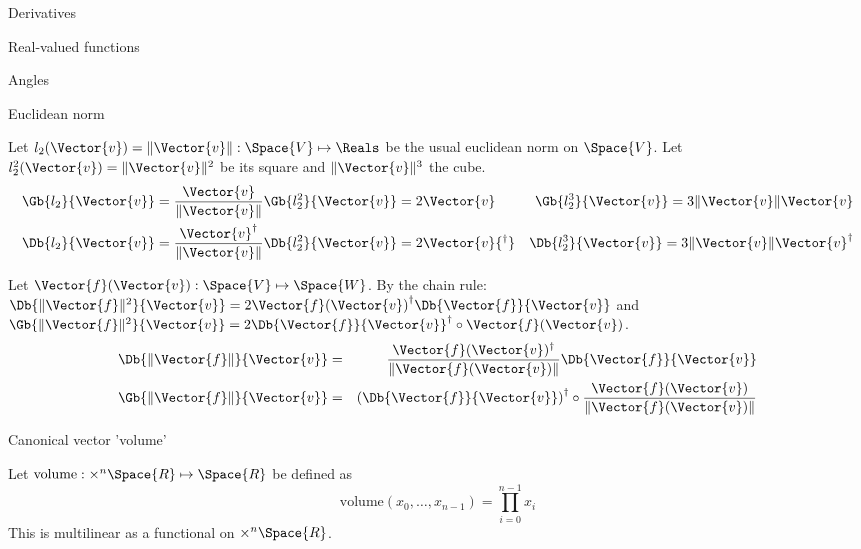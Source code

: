 \begin{plSection}{Derivatives}
\begin{plSection}{Real-valued functions}
\begin{plSection}{Angles}
\end{plSection}%
\begin{plSection}{Euclidean norm}
\label{sec:derivatives-of-euclidean-norm}

Let $l_2(\Vector{v}) = \| \Vector{v}  \|: \Space{V} \mapsto \Reals$
be the usual euclidean norm on $\Space{V}$.
Let $l_2^2(\Vector{v}) = \| \Vector{v}  \|^2 $
be its square and $ \| \Vector{v}  \|^3$ the cube.
\begin{eqnarray}
\label{eq:l2-gradient}
\Gb{l_2}{\Vector{v}} = \frac{ \Vector{v} }{ \| \Vector{v}  \|} &
\Gb{l_2^2}{\Vector{v}} =  2\Vector{v} &
\Gb{l_2^3}{\Vector{v}} = 3 \| \Vector{v}  \| \Vector{v} \\
\Db{l_2}{\Vector{v}} = \frac{ \Vector{v}^\dagger }{ \| \Vector{v}  \|} &
\Db{l_2^2}{\Vector{v}} = 2\Vector{v}{^\dagger} &
\Db{l_2^3}{\Vector{v}} = 3 \| \Vector{v}  \| \Vector{v}^\dagger \nonumber
\end{eqnarray}

Let $\Vector{f}(\Vector{v}) : \Space{V} \mapsto \Space{W}$.
By the chain rule:
$\Db{\| \Vector{f} \|^2}{\Vector{v}}  =  2 {\Vector{f}(\Vector{v})}^{\dagger} \Db{\Vector{f}}{\Vector{v}} $
and
$\Gb{\| \Vector{f} \|^2}{\Vector{v}}  =  2 \Db{\Vector{f}}{\Vector{v}}^\dagger \circ \Vector{f}(\Vector{v})$.
\begin{eqnarray}
\label{eq:norm_derivative}
\Db{\| \Vector{f} \|}{\Vector{v}}
& = &
\frac{\Vector{f}(\Vector{v})^\dagger}{\| \Vector{f}(\Vector{v}) \|} \Db{\Vector{f}}{\Vector{v}}  \\
\Gb{\| \Vector{f} \|}{\Vector{v}}
& = &
\left(\Db{\Vector{f}}{\Vector{v}}\right)^\dagger \circ  \frac{\Vector{f}(\Vector{v})}{ \| \Vector{f}(\Vector{v})  \|}
\label{eq:norm_gradient}
\end{eqnarray}

\end{plSection}%
\begin{plSection}{Canonical vector 'volume'}
\label{sec:Derivative-of-canonical-vector-volume}

Let $\text{volume} : \times^{n} \Space{R} \mapsto \Space{R}$ 
be defined as
\begin{equation}
\text{volume} \left( x_0 , \ldots , x_{n-1} \right) = \prod_{i=0}^{n-1} x_i
\end{equation}
This is multilinear as a functional on $\times^{n} \Space{R}$.


\end{plSection}
\end{plSection}
\end{plSection}
